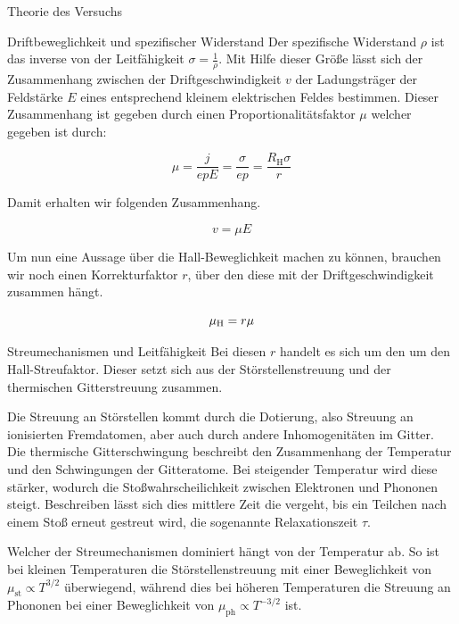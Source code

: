 \documentclass[pdftex, a4paper,11pt, twoside, ngerman]{report}
\begin{document}
\begin{chapter}{Theorie des Versuchs}
\begin{section}{Driftbeweglichkeit und spezifischer Widerstand}
            Der spezifische Widerstand $\rho$ ist das inverse von der Leitfähigkeit $\sigma = \frac 1\rho$.
            Mit Hilfe dieser Größe lässt sich der Zusammenhang zwischen der Driftgeschwindigkeit $v$ der Ladungsträger der Feldstärke $E$ eines entsprechend kleinem elektrischen Feldes bestimmen.
            Dieser Zusammenhang ist gegeben durch einen Proportionalitätsfaktor $\mu$ welcher gegeben ist durch:
            
            \begin{equation}
                \mu = \frac j{epE} = \frac \sigma{ep} = \frac{R_\text{H} \sigma}r
            \end{equation}
            
            Damit erhalten wir folgenden Zusammenhang.
            
            \begin{equation}
                v = \mu E
            \end{equation}
            
            Um nun eine Aussage über die Hall-Beweglichkeit machen zu können, brauchen wir noch einen Korrekturfaktor $r$, über den diese mit der Driftgeschwindigkeit zusammen hängt.
            
            \begin{equation}
                \mu_\text H =r\mu
            \end{equation}
            
        \end{section}

        \begin{section}{Streumechanismen und Leitfähigkeit}
             Bei diesen $r$ handelt es sich um den um den Hall-Streufaktor.
             Dieser setzt sich aus der Störstellenstreuung und der thermischen Gitterstreuung zusammen.
             
             Die Streuung an Störstellen kommt durch die Dotierung, also Streuung an ionisierten Fremdatomen, aber auch durch andere Inhomogenitäten im Gitter.
             Die thermische Gitterschwingung beschreibt den Zusammenhang der Temperatur und den Schwingungen der Gitteratome. 
             Bei steigender Temperatur wird diese stärker, wodurch die Stoßwahrscheilichkeit zwischen Elektronen und Phononen steigt.
             Beschreiben lässt sich dies mittlere Zeit die vergeht, bis ein Teilchen nach einem Stoß erneut gestreut wird, die sogenannte Relaxationszeit $\tau$.

             Welcher der Streumechanismen dominiert hängt von der Temperatur ab.
             So ist bei kleinen Temperaturen die Störstellenstreuung mit einer Beweglichkeit von $\mu_{\text{st}} \propto T^{3/2}$ überwiegend, während dies bei höheren Temperaturen die Streuung an Phononen bei einer Beweglichkeit von $\mu_{\text{ph}} \propto T^{-3/2}$ ist.


\end{section}
\end{chapter}
\end{document}
